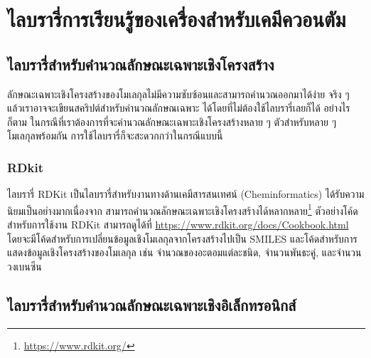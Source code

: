 

\chapter{ไลบรารี่การเรียนรู้ของเครื่องสำหรับเคมีควอนตัม}
\label{ch:ml_lib}

\section{ไลบรารี่สำหรับคำนวณลักษณะเฉพาะเชิงโครงสร้าง}

ลักษณะเฉพาะเชิงโครงสร้างของโมเลกุลไม่มีความซับซ้อนและสามารถคำนวณออกมาได้ง่าย จริง ๆ แล้วเราอาจจะเขียนสคริปต์สำหรับคำนวณลักษณเฉพาะ%
ได้โดยที่ไม่ต้องใช้ไลบรารี่เลยก็ได้ อย่างไรก็ตาม ในกรณีที่เราต้องการที่จะคำนวณลักษณะเฉพาะเชิงโครงสร้างหลาย ๆ ตัวสำหรับหลาย ๆ โมเลกุลพร้อมกัน 
การใช้ไลบรารี่ก็จะสะดวกกว่าในกรณีแบบนี้

\subsection{RDkit}

ไลบรารี่ RDKit เป็นไลบรารี่สำหรับงานทางด้านเคมีสารสนเทศน์ (Cheminformatics)\autocite{rdkit} ได้รับความนิยมเป็นอย่างมากเนื่องจาก%
สามารถคำนวณลักษณะเฉพาะเชิงโครงสร้างได้หลากหลาย\footnote{\url{https://www.rdkit.org/}} ตัวอย่างโค้ดสำหรับการใช้งาน RDKit 
สามารถดูได้ที่ \url{https://www.rdkit.org/docs/Cookbook.html} โดยจะมีโค้ดสำหรับการเปลี่ยนข้อมูลเชิงโมเลกุลจากโครงสร้างไปเป็น 
SMILES และโค้ดสำหรับการแสดงข้อมูลเชิงโครงสร้างของโมเลกุล เช่น จำนวณของอะตอมแต่ละชนิด, จำนวนพันธะคู่, และจำนวนวงเบนซีน 

\section{ไลบรารี่สำหรับคำนวณลักษณะเฉพาะเชิงอิเล็กทรอนิกส์}


